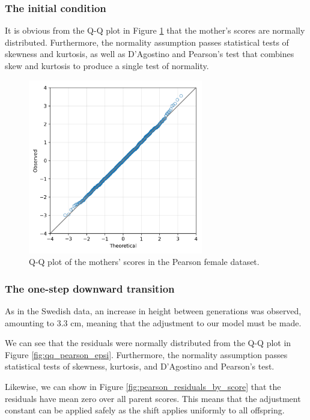 \documentclass[letterpaper,10pt]{article} %
\begin{document}
\subsubsection*{The initial condition}

It is obvious from the Q-Q plot in Figure \ref{fig:qq_pearson_x} that the mother's scores are normally distributed. Furthermore, the normality assumption passes statistical tests of skewness and kurtosis, as well as D’Agostino and Pearson's test that combines skew and kurtosis to produce a single test of normality.

\begin{figure}[h]
\includegraphics[width=3in]{figures/qq_pearson_x.png}
\centering
\caption{Q-Q plot of the mothers' scores in the Pearson female dataset.}
\label{fig:qq_pearson_x}
\end{figure}


\subsubsection*{The one-step downward transition}

As in the Swedish data, an increase in height between generations was observed, amounting to 3.3 cm, meaning that the adjustment to our model must be made. 

We can see that the residuals were normally distributed from the Q-Q plot in Figure \ref{fig:qq_pearson_epsi}. Furthermore, the normality assumption passes statistical tests of skewness, kurtosis, and D’Agostino and Pearson's test.

Likewise, we can show in Figure \ref{fig:pearson_residuals_by_score} that the residuals have mean zero over all parent scores. This means that the adjustment constant can be applied safely as the shift applies uniformly to all offspring. 
\end{document}
